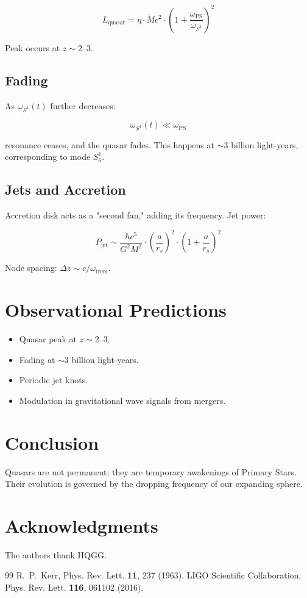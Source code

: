 \documentclass[12pt,a4paper]{article}
\begin{document}
\[
L_{\text{quasar}} = \eta \cdot \dot{M} c^2 \cdot \left(1 + \frac{\omega_{\text{PS}}}{\omega_{S^1}}\right)^2
\]

Peak occurs at \(z \sim 2\)–3.

\subsection{Fading}

As \(\omega_{S^1}(t)\) further decreases:

\[
\omega_{S^1}(t) \ll \omega_{\text{PS}}
\]

resonance ceases, and the quasar fades. This happens at \(\sim 3\) billion light-years, corresponding to mode \(S^1_6\).

\subsection{Jets and Accretion}

Accretion disk acts as a "second fan," adding its frequency. Jet power:

\[
P_{\text{jet}} \sim \frac{\hbar c^5}{G^2 M^2} \cdot \left(\frac{a}{r_s}\right)^2 \cdot \left(1 + \frac{a}{r_s}\right)^2
\]

Node spacing: \(\Delta z \sim c / \omega_{\text{trem}}\).

\section{Observational Predictions}

\begin{itemize}
\item Quasar peak at \(z \sim 2\)–3.
\item Fading at \(\sim 3\) billion light-years.
\item Periodic jet knots.
\item Modulation in gravitational wave signals from mergers.
\end{itemize}

\section{Conclusion}

Quasars are not permanent; they are temporary awakenings of Primary Stars. Their evolution is governed by the dropping frequency of our expanding sphere.

\begin{center}
\end{center}

\section*{Acknowledgments}

The authors thank HQGG.

\begin{thebibliography}{99}
 R.~P.~Kerr, Phys. Rev. Lett. \textbf{11}, 237 (1963).
 LIGO Scientific Collaboration, Phys. Rev. Lett. \textbf{116}, 061102 (2016).
\end{thebibliography}
\end{document}
